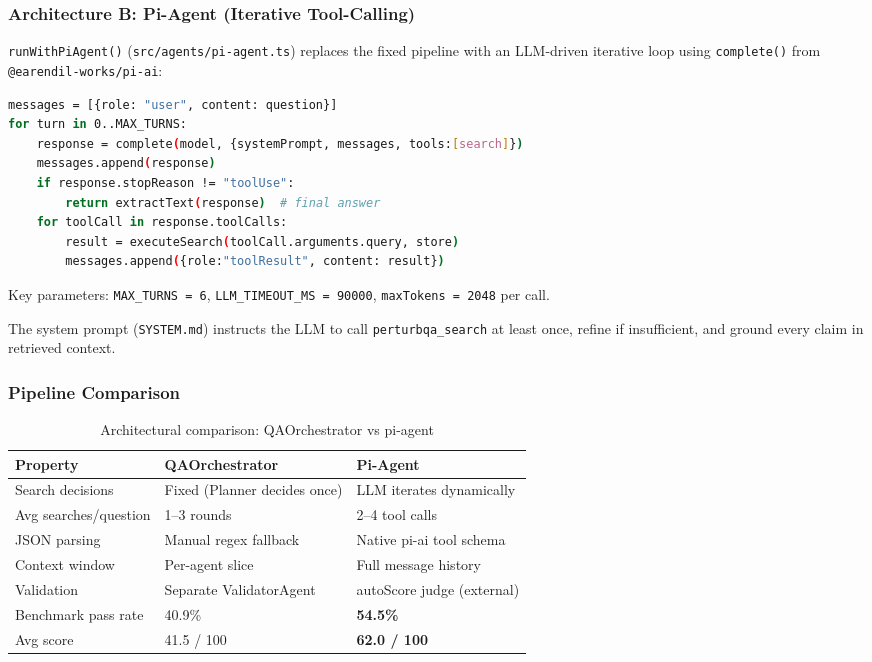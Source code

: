 \documentclass[12pt, a4paper]{article}
\begin{document}
\subsubsection{Architecture B: Pi-Agent (Iterative Tool-Calling)}

\texttt{runWithPiAgent()} (\texttt{src/agents/pi-agent.ts}) replaces the fixed pipeline
with an LLM-driven iterative loop using \texttt{complete()} from \texttt{@earendil-works/pi-ai}:

\begin{lstlisting}[language=bash, caption={Pi-agent loop pseudocode}]
messages = [{role: "user", content: question}]
for turn in 0..MAX_TURNS:
    response = complete(model, {systemPrompt, messages, tools:[search]})
    messages.append(response)
    if response.stopReason != "toolUse":
        return extractText(response)  # final answer
    for toolCall in response.toolCalls:
        result = executeSearch(toolCall.arguments.query, store)
        messages.append({role:"toolResult", content: result})
\end{lstlisting}

Key parameters: \texttt{MAX\_TURNS = 6}, \texttt{LLM\_TIMEOUT\_MS = 90000},
\texttt{maxTokens = 2048} per call.

The system prompt (\texttt{SYSTEM.md}) instructs the LLM to call \texttt{perturbqa\_search}
at least once, refine if insufficient, and ground every claim in retrieved context.

\subsubsection{Pipeline Comparison}

\begin{table}[ht]
\centering
\caption{Architectural comparison: QAOrchestrator vs pi-agent}
\begin{tabular}{lll}
\toprule
\textbf{Property} & \textbf{QAOrchestrator} & \textbf{Pi-Agent} \\
\midrule
Search decisions  & Fixed (Planner decides once) & LLM iterates dynamically \\
Avg searches/question & 1--3 rounds & 2--4 tool calls \\
JSON parsing      & Manual regex fallback & Native pi-ai tool schema \\
Context window    & Per-agent slice & Full message history \\
Validation        & Separate ValidatorAgent & autoScore judge (external) \\
Benchmark pass rate & 40.9\% & \textbf{54.5\%} \\
Avg score         & 41.5 / 100 & \textbf{62.0 / 100} \\
\bottomrule
\end{tabular}
\end{table}
\end{document}

